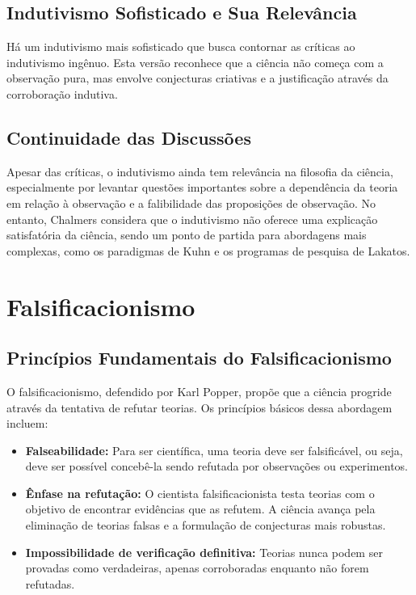 \documentclass{article} %
\begin{document}
\subsection{Indutivismo Sofisticado e Sua Relevância}

Há um indutivismo mais sofisticado que busca contornar as críticas ao indutivismo ingênuo. Esta versão reconhece que a ciência não começa com a observação pura, mas envolve conjecturas criativas e a justificação através da corroboração indutiva.

\subsection{Continuidade das Discussões}

Apesar das críticas, o indutivismo ainda tem relevância na filosofia da ciência, especialmente por levantar questões importantes sobre a dependência da teoria em relação à observação e a falibilidade das proposições de observação. No entanto, Chalmers considera que o indutivismo não oferece uma explicação satisfatória da ciência, sendo um ponto de partida para abordagens mais complexas, como os paradigmas de Kuhn e os programas de pesquisa de Lakatos.

\newpage

\section{Falsificacionismo}

\subsection{Princípios Fundamentais do Falsificacionismo}

O falsificacionismo, defendido por Karl Popper, propõe que a ciência progride através da tentativa de refutar teorias. Os princípios básicos dessa abordagem incluem:

\begin{itemize}
    \item \textbf{Falseabilidade:} Para ser científica, uma teoria deve ser falsificável, ou seja, deve ser possível concebê-la sendo refutada por observações ou experimentos.
    
    \item \textbf{Ênfase na refutação:} O cientista falsificacionista testa teorias com o objetivo de encontrar evidências que as refutem. A ciência avança pela eliminação de teorias falsas e a formulação de conjecturas mais robustas.
    
    \item \textbf{Impossibilidade de verificação definitiva:} Teorias nunca podem ser provadas como verdadeiras, apenas corroboradas enquanto não forem refutadas.
\end{itemize}
\end{document}
